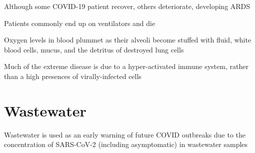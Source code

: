 \documentclass{notes}
\begin{document}
Although some COVID-19 patient recover, others deteriorate, developing ARDS

Patients commonly end up on ventilators and die

Oxygen levels in blood plummet as their alveoli become stuffed with fluid, white blood cells, mucus, and the detritus of destroyed lung cells

Much of the extreme disease is due to a hyper-activated immune system, rather than a high presences of virally-infected cells


\section{Wastewater}

Wastewater is used as an early warning of future COVID outbreaks due to the concentration of SARS-CoV-2 (including asymptomatic) in wastewater samples
\end{document}
